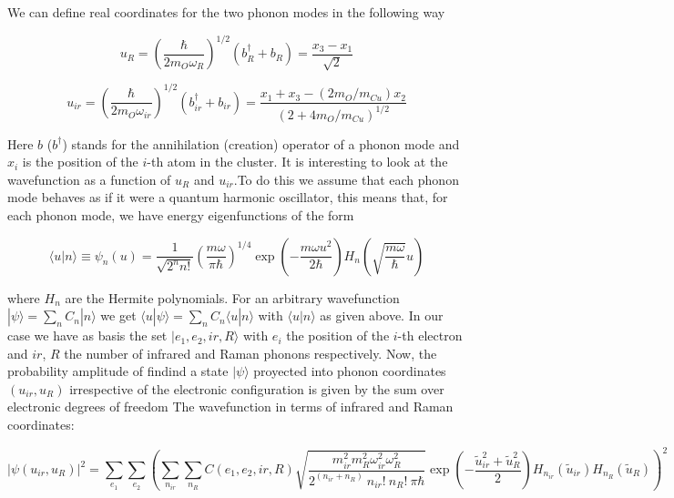 We can define real coordinates for the two phonon modes in the following way\cite{MustredeLeon1992}

\begin{equation}\label{eq:uR}
u_R = \left(\frac{\hbar}{2 m_O \omega_R}\right)^{1/2}(b_R^\dagger + b_R) = \frac{x_3 - x_1}{\sqrt{2}}
\end{equation}

\begin{equation}\label{uir}
u_{ir} = \left(\frac{\hbar}{2 m_O \omega_{ir}}\right)^{1/2}(b^\dagger_{ir}+b_{ir}) = \frac{ x_1 + x_3 - ( 2 m_O/m_{Cu})x_2}{(2 + 4 m_O/m_{Cu})^{1/2}}
\end{equation}

Here $b$ ($b^\dagger$) stands for the annihilation (creation) operator of a phonon mode and $x_i$ is the position of the $i$-th atom in the cluster. It is interesting to look at the wavefunction as a function of $u_R$ and $u_{ir}$.To do this we assume that each phonon mode behaves as if it were a quantum harmonic oscillator, this means that, for each phonon mode, we have energy eigenfunctions of the form

\begin{equation}\label{eq:harmOscProj}
\langle u | n \rangle \equiv \psi_n(u) = \frac{1}{\sqrt{2^n n!}} \left(\frac{m \omega}{\pi \hbar}\right)^{1/4}\exp\left(-\frac{m \omega u^2}{2 \hbar}\right) H_n\left( \sqrt{\frac{m \omega}{\hbar}} u \right) 
\end{equation}

where $H_n$ are the Hermite polynomials. For an arbitrary wavefunction $ | \psi \rangle = \sum_n C_n |n \rangle$ we get $ \langle u | \psi \rangle = \sum_n C_n \langle u | n \rangle$ with $\langle u | n \rangle$ as given above. In our case we have as basis the set ${| e_1, e_2, ir, R \rangle}$ with $e_i$ the position of the $i$-th electron and $ir$, $R$ the number of infrared and Raman phonons respectively. Now, the probability amplitude of findind a state $|\psi\rangle$ proyected into phonon coordinates $(u_{ir},u_R)$ irrespective of the electronic configuration is given by the sum over electronic degrees of freedom The wavefunction in terms of infrared and Raman coordinates:

\begin{equation}\label{eq:phonon-coord-projection}
|\psi(u_{ir}, u_R)|^2 = \sum_{e_1}\sum_{e_2} \left(\sum_{n_{ir}} \sum_{n_R} C(e_1, e_2, ir, R) \sqrt{\frac{ m_{ir}^2 m_R^2 \omega_{ir}^2 \omega_R^2 }{2^{(n_{ir} + n_R)}\ n_{ir}!\ n_R!\ \pi \hbar}} \exp \left( - \frac{ \tilde{u}_{ir}^2 + \tilde{u}_R^2 }{2}\right) H_{n_{ir}} ( \tilde{u}_{ir}) H_{n_R}( \tilde{u}_R) \right)^2
\end{equation}

